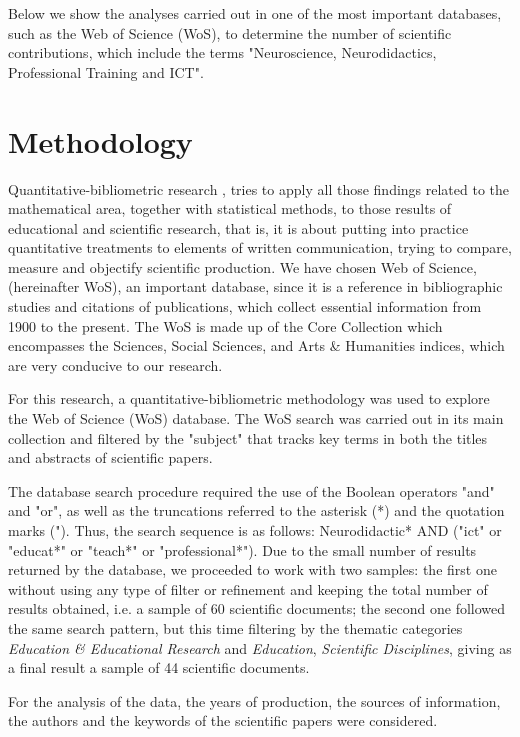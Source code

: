 \documentclass[english]{textolivre}
\begin{document}
Below we show the analyses carried out in one of the most important databases, such as the Web of Science (WoS), to determine the number of scientific contributions, which include the terms "Neuroscience, Neurodidactics, Professional Training and ICT".

\section{Methodology}

Quantitative-bibliometric research \cite{davila_bibliometri:_2009,ramos_meza_alisis_2021}, tries to apply all those findings related to the mathematical area, together with statistical methods, to those results of educational and scientific research, that is, it is about putting into practice quantitative treatments to elements of written communication, trying to compare, measure and objectify scientific production. We have chosen Web of Science, (hereinafter WoS), an important database, since it is a reference in bibliographic studies and citations of publications, which collect essential information from 1900 to the present. The WoS is made up of the Core Collection which encompasses the Sciences, Social Sciences, and Arts \& Humanities indices, which are very conducive to our research.

For this research, a quantitative-bibliometric methodology was used to explore the Web of Science (WoS) database. The WoS search was carried out in its main collection and filtered by the "subject" that tracks key terms in both the titles and abstracts of scientific papers.

The database search procedure required the use of the Boolean operators "and" and "or", as well as the truncations referred to the asterisk (*) and the quotation marks ("). Thus, the search sequence is as follows: Neurodidactic* AND ("ict" or "educat*" or "teach*" or "professional*"). Due to the small number of results returned by the database, we proceeded to work with two samples: the first one without using any type of filter or refinement and keeping the total number of results obtained, i.e. a sample of 60 scientific documents; the second one followed the same search pattern, but this time filtering by the thematic categories \textit{Education \& Educational Research} and \textit{Education}, \textit{Scientific Disciplines}, giving as a final result a sample of 44 scientific documents.

For the analysis of the data, the years of production, the sources of information, the authors and the keywords of the scientific papers were considered.
\end{document}
